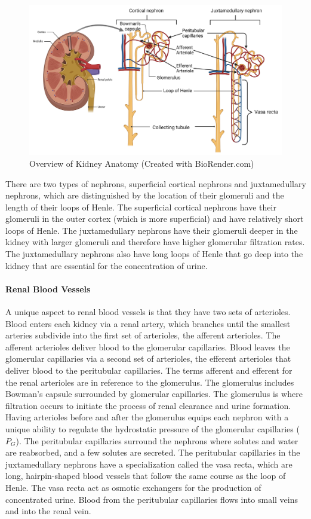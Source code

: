 \begin{figure}[!h]
    \centering
    \includegraphics[width=1.0\linewidth]{./figure/Kidney_Anatomy.png}
    \caption{Overview of Kidney Anatomy \footnotesize{(Created with BioRender.com)}}
    \label{fig:Kidney_Anatomy}
\end{figure}

There are two types of nephrons, superficial cortical nephrons and juxtamedullary nephrons, which are distinguished by the location of their glomeruli and the length of their loops of Henle. The superficial cortical nephrons have their glomeruli in the outer cortex (which is more superficial) and have relatively short loops of Henle. The juxtamedullary nephrons have their glomeruli deeper in the kidney with larger glomeruli and therefore have higher glomerular filtration rates. The juxtamedullary nephrons also have long loops of Henle that go deep into the kidney that are essential for the concentration of urine. 

\paragraph{Renal Blood Vessels}
A unique aspect to renal blood vessels is that they have two sets of arterioles. Blood enters each kidney via a renal artery, which branches until the smallest arteries subdivide into the first set of arterioles, the afferent arterioles. The afferent arterioles deliver blood to the glomerular capillaries. Blood leaves the glomerular capillaries via a second set of arterioles, the efferent arterioles that deliver blood to the peritubular capillaries. The terms afferent and efferent for the renal arterioles are in reference to the glomerulus. The glomerulus includes Bowman’s capsule surrounded by glomerular capillaries. The glomerulus is where filtration occurs to initiate the process of renal clearance and urine formation. Having arterioles before and after the glomerulus equips each nephron with a unique ability to regulate the hydrostatic pressure of the glomerular capillaries ($P_G$). The peritubular capillaries surround the nephrons where solutes and water are reabsorbed, and a few solutes are secreted. The peritubular capillaries in the juxtamedullary nephrons have a specialization called the vasa recta, which are long, hairpin-shaped blood vessels that follow the same course as the loop of Henle. The vasa recta act as osmotic exchangers for the production of concentrated urine. Blood from the peritubular capillaries flows into small veins and into the renal vein.

